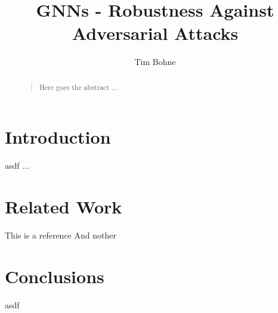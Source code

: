 \documentclass[a4paper,preprint]{sig-alternate}
\begin{document}
\title{GNNs - Robustness Against Adversarial Attacks}


%
\author{
%
\alignauthor Tim Bohne\\
}

\maketitle

\begin{abstract}
\begin{quote}
Here goes the abstract ... 
\end{quote}
\end{abstract}

\section{Introduction}
asdf ...


\section{Related Work}

This is a reference \cite{Z_gner_2019}\newline
And nother \cite{10.1145/3394486.3403217}


\section{Conclusions}
asdf



\end{document}
